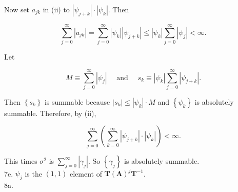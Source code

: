\documentclass[10pt]{article}
\begin{document}
Now set $a_{j k}$ in (ii) to $\left|\psi_{j+k}\right| \cdot\left|\psi_{k}\right|$. Then

$$
\sum_{j=0}^{\infty}\left|a_{j k}\right|=\sum_{j=0}^{\infty}\left|\psi_{k}\right|\left|\psi_{j+k}\right| \leq\left|\psi_{k}\right| \sum_{j=0}^{\infty}\left|\psi_{j}\right|<\infty .
$$

Let

$$
M \equiv \sum_{j=0}^{\infty}\left|\psi_{j}\right| \quad \text { and } \quad s_{k} \equiv\left|\psi_{k}\right| \sum_{j=0}^{\infty}\left|\psi_{j+k}\right| .
$$

Then $\left\{s_{k}\right\}$ is summable because $\left|s_{k}\right| \leq\left|\psi_{k}\right| \cdot M$ and $\left\{\psi_{k}\right\}$ is absolutely summable. Therefore, by (ii),

$$
\sum_{j=0}^{\infty}\left(\sum_{k=0}^{\infty}\left|\psi_{j+k}\right| \cdot\left|\psi_{k}\right|\right)<\infty .
$$

This times $\sigma^{2}$ is $\sum_{j=0}^{\infty}\left|\gamma_{j}\right|$. So $\left\{\gamma_{j}\right\}$ is absolutely summable.\\
7e. $\psi_{j}$ is the $(1,1)$ element of $\mathbf{T}(\mathbf{\Lambda})^{j} \mathbf{T}^{-1}$.\\
8a.
\end{document}
